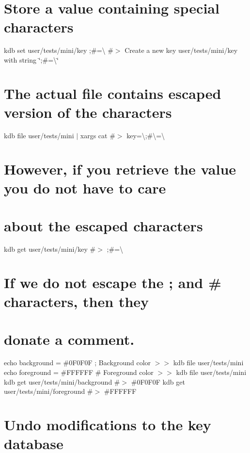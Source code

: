 \section*{Store a value containing special characters}

kdb set user/tests/mini/key \textquotesingle{};\#=\textbackslash{}\textquotesingle{} \#$>$ Create a new key user/tests/mini/key with string \char`\"{};\#=\textbackslash{}\char`\"{}

\section*{The actual file contains escaped version of the characters}

kdb file user/tests/mini $\vert$ xargs cat \#$>$ key=\textbackslash{};\#\textbackslash{}=\textbackslash{}

\section*{However, if you retrieve the value you do not have to care}

\section*{about the escaped characters}

kdb get user/tests/mini/key \#$>$ ;\#=\textbackslash{}

\section*{If we do not escape the {\ttfamily ;} and {\ttfamily \#} characters, then they}

\section*{donate a comment.}

echo \textquotesingle{}background = \#0\+F0\+F0F ; Background color\textquotesingle{} $>$$>$ {\ttfamily kdb file user/tests/mini} echo \textquotesingle{}foreground = \#F\+F\+F\+F\+FF \# Foreground color\textquotesingle{} $>$$>$ {\ttfamily kdb file user/tests/mini} kdb get user/tests/mini/background \#$>$ \#0\+F0\+F0F kdb get user/tests/mini/foreground \#$>$ \#\+F\+F\+F\+F\+FF

\section*{Undo modifications to the key database}

